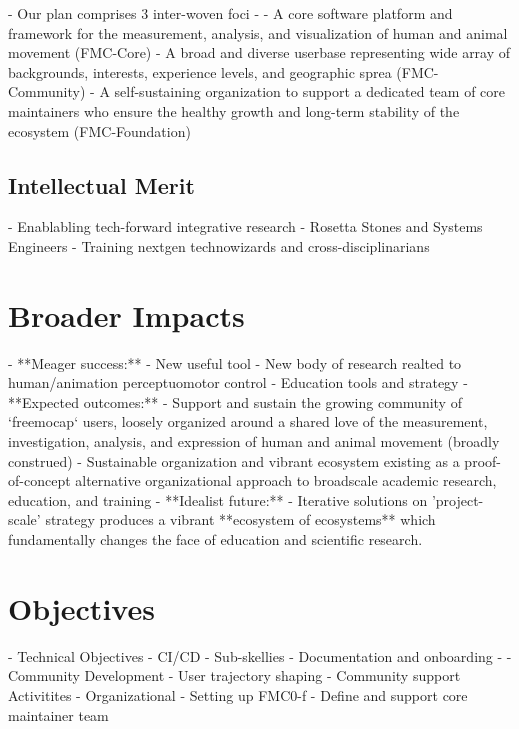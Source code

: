 \documentclass[11pt]{article}
\begin{document}

- Our plan comprises 3 inter-woven foci - 
- A core software platform and framework for the measurement, analysis, and visualization of human and animal movement (FMC-Core)
- A broad and diverse userbase representing wide array of backgrounds, interests, experience levels, and geographic sprea (FMC-Community)
- A self-sustaining organization to support a dedicated team of core maintainers who ensure the healthy growth and long-term stability of the ecosystem (FMC-Foundation)

\subsection{Intellectual Merit\label{sec:IM}}

- Enablabling tech-forward integrative research
- Rosetta Stones and Systems Engineers
- Training nextgen technowizards and cross-disciplinarians

\section{Broader Impacts\label{sec:BI}}
- **Meager success:**
  - New useful tool
  - New body of research realted to human/animation perceptuomotor control
  - Education tools and strategy
- **Expected outcomes:**
  - Support and sustain the growing community of `freemocap` users, loosely organized around a shared love of the measurement, investigation, analysis, and expression of human and animal movement (broadly construed) 
  - Sustainable organization and vibrant ecosystem existing as a proof-of-concept alternative organizational approach to broadscale academic research, education, and training
- **Idealist future:**
  - Iterative solutions on 'project-scale' strategy produces a vibrant **ecosystem of ecosystems** which fundamentally changes the face of education and scientific research.

\section{Objectives}
 - Technical Objectives
    - CI/CD
    - Sub-skellies
    - Documentation and onboarding
    - 
 - Community Development
    - User trajectory shaping
    - Community support Activitites
 - Organizational 
    - Setting up FMC0-f
    - Define and support core maintainer team
\end{document}
